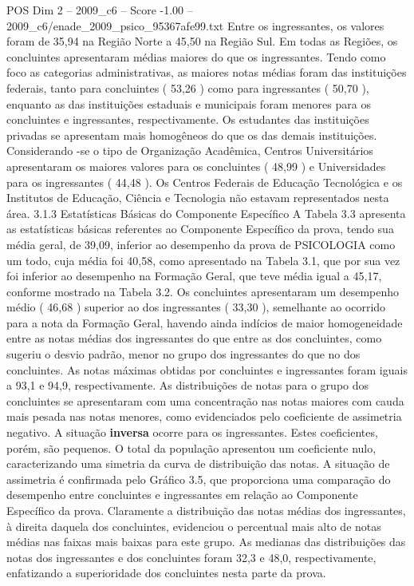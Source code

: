 \begin{textsample}{POS Dim 2 – 2009\_c6 – Score -1.00 – 2009\_c6/enade\_2009\_psico\_95367afe99.txt}
Entre os ingressantes, os valores foram de 35,94 na Região Norte a 45,50 na Região Sul.
Em todas as Regiões, os concluintes apresentaram médias maiores do que os ingressantes.
Tendo como foco as categorias administrativas, as maiores notas médias foram das instituições federais, tanto para concluintes ( 53,26 ) como para ingressantes ( 50,70 ), enquanto as das instituições estaduais e municipais foram menores para os concluintes e ingressantes, respectivamente.
Os estudantes das instituições privadas se apresentam mais homogêneos do que os das demais instituições.
Considerando -se o tipo de Organização Acadêmica, Centros Universitários apresentaram os maiores valores para os concluintes ( 48,99 ) e Universidades para os ingressantes ( 44,48 ).
Os Centros Federais de Educação Tecnológica e os Institutos de Educação, Ciência e Tecnologia não estavam representados nesta área. 3.1.3 Estatísticas Básicas do Componente Específico A Tabela 3.3 apresenta as estatísticas básicas referentes ao Componente Específico da prova, tendo sua média geral, de 39,09, inferior ao desempenho da prova de PSICOLOGIA como um todo, cuja média foi 40,58, como apresentado na Tabela 3.1, que por sua vez foi inferior ao desempenho na Formação Geral, que teve média igual a 45,17, conforme mostrado na Tabela 3.2.
Os concluintes apresentaram um desempenho médio ( 46,68 ) superior ao dos ingressantes ( 33,30 ), semelhante ao ocorrido para a nota da Formação Geral, havendo ainda indícios de maior homogeneidade entre as notas médias dos ingressantes do que entre as dos concluintes, como sugeriu o desvio padrão, menor no grupo dos ingressantes do que no dos concluintes.
As notas máximas obtidas por concluintes e ingressantes foram iguais a 93,1 e 94,9, respectivamente.
As distribuições de notas para o grupo dos concluintes se apresentaram com uma concentração nas notas maiores com cauda mais pesada nas notas menores, como evidenciados pelo coeficiente de assimetria negativo.
A situação \textbf{inversa} ocorre para os ingressantes.
Estes coeficientes, porém, são pequenos.
O total da população apresentou um coeficiente nulo, caracterizando uma simetria da curva de distribuição das notas.
A situação de assimetria é confirmada pelo Gráfico 3.5, que proporciona uma comparação do desempenho entre concluintes e ingressantes em relação ao Componente Específico da prova.
Claramente a distribuição das notas médias dos ingressantes, à direita daquela dos concluintes, evidenciou o percentual mais alto de notas médias nas faixas mais baixas para este grupo.
As medianas das distribuições das notas dos ingressantes e dos concluintes foram 32,3 e 48,0, respectivamente, enfatizando a superioridade dos concluintes nesta parte da prova.

\end{textsample}
